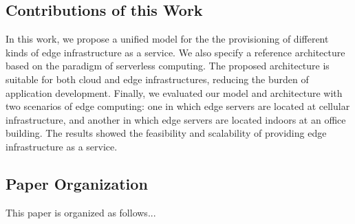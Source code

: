 \subsection{Contributions of this Work}

In this work, we propose a unified model for the the provisioning of different kinds of edge infrastructure as a service. We also specify a reference architecture based on the paradigm of serverless computing. The proposed architecture is suitable for both cloud and edge infrastructures, reducing the burden of application development. Finally, we evaluated our model and architecture with two scenarios of edge computing: one in which edge servers are located at cellular infrastructure, and another in which edge servers are located indoors at an office building. The results showed the feasibility and scalability of providing edge infrastructure as a service.

\subsection{Paper Organization}

This paper is organized as follows...




